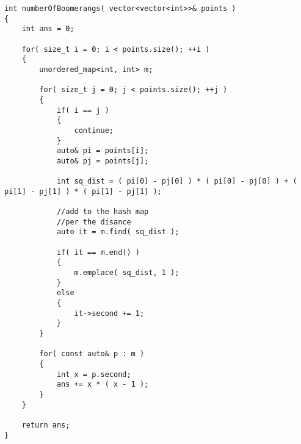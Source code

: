 \setcounter{lstlisting}{0}
\begin{lstlisting}[style=customc, caption={Hash Map}]
int numberOfBoomerangs( vector<vector<int>>& points )
{
    int ans = 0;

    for( size_t i = 0; i < points.size(); ++i )
    {
        unordered_map<int, int> m;

        for( size_t j = 0; j < points.size(); ++j )
        {
            if( i == j )
            {
                continue;
            }
            auto& pi = points[i];
            auto& pj = points[j];

            int sq_dist = ( pi[0] - pj[0] ) * ( pi[0] - pj[0] ) + ( pi[1] - pj[1] ) * ( pi[1] - pj[1] );

            //add to the hash map
            //per the disance
            auto it = m.find( sq_dist );

            if( it == m.end() )
            {
                m.emplace( sq_dist, 1 );
            }
            else
            {
                it->second += 1;
            }
        }

        for( const auto& p : m )
        {
            int x = p.second;
            ans += x * ( x - 1 );
        }
    }

    return ans;
}
\end{lstlisting}